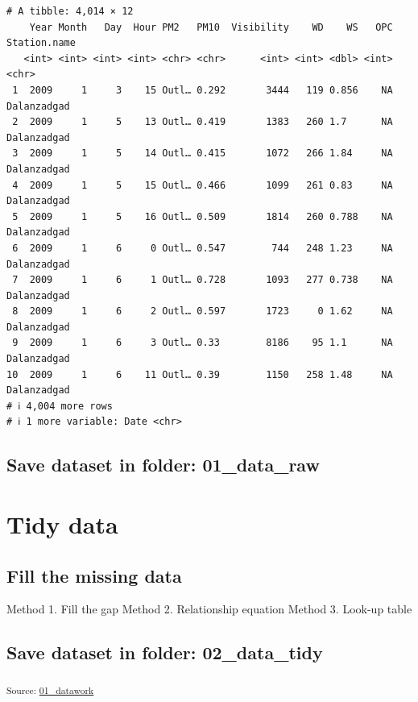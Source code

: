 \documentclass[
]{agujournal2019}
\begin{document}
\begin{verbatim}
# A tibble: 4,014 × 12
    Year Month   Day  Hour PM2   PM10  Visibility    WD    WS   OPC Station.name
   <int> <int> <int> <int> <chr> <chr>      <int> <int> <dbl> <int> <chr>       
 1  2009     1     3    15 Outl… 0.292       3444   119 0.856    NA Dalanzadgad 
 2  2009     1     5    13 Outl… 0.419       1383   260 1.7      NA Dalanzadgad 
 3  2009     1     5    14 Outl… 0.415       1072   266 1.84     NA Dalanzadgad 
 4  2009     1     5    15 Outl… 0.466       1099   261 0.83     NA Dalanzadgad 
 5  2009     1     5    16 Outl… 0.509       1814   260 0.788    NA Dalanzadgad 
 6  2009     1     6     0 Outl… 0.547        744   248 1.23     NA Dalanzadgad 
 7  2009     1     6     1 Outl… 0.728       1093   277 0.738    NA Dalanzadgad 
 8  2009     1     6     2 Outl… 0.597       1723     0 1.62     NA Dalanzadgad 
 9  2009     1     6     3 Outl… 0.33        8186    95 1.1      NA Dalanzadgad 
10  2009     1     6    11 Outl… 0.39        1150   258 1.48     NA Dalanzadgad 
# ℹ 4,004 more rows
# ℹ 1 more variable: Date <chr>
\end{verbatim}

\subsection{Save dataset in folder:
01\_data\_raw}\label{save-dataset-in-folder-01_data_raw}

\section{Tidy data}\label{tidy-data}

\subsection{Fill the missing data}\label{fill-the-missing-data}

Method 1. Fill the gap Method 2. Relationship equation Method 3. Look-up
table

\subsection{Save dataset in folder:
02\_data\_tidy}\label{save-dataset-in-folder-02_data_tidy}

\textsubscript{Source:
\href{https://EmouAcademy.github.io/my-awesome-manuscripts/notebooks/01_datawork-preview.html\#5fdcfffa-f2a7-4d02-8ea6-db89fdfaaa29}{01\_datawork}}
\end{document}
